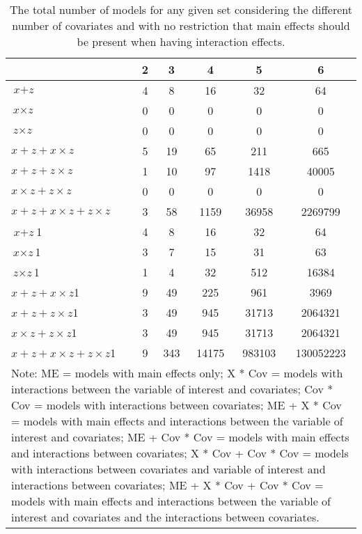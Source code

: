 \begin{table}[!h]
\centering
\caption{The total number of models for any given set considering the different number of covariates and with no restriction that main effects should be present when having interaction effects.} 
\begin{tabular}{lccccc}
  \hline
 & 2 & 3 & 4 & 5 & 6 \\ 
  \hline
$\textit{x} + \textit{z}$ & 4 & 8 & 16 & 32 & 64 \\ 
  $\textit{x} \times \textit{z}$ & 0 & 0 & 0 & 0 & 0 \\ 
  $\textit{z} \times \textit{z}$ & 0 & 0 & 0 & 0 & 0 \\ 
  $\textit{x} + \textit{z} + \textit{x} \times \textit{z}$ & 5 & 19 & 65 & 211 & 665 \\ 
  $\textit{x} + \textit{z} + \textit{z} \times \textit{z}$ & 1 & 10 & 97 & 1418 & 40005 \\ 
  $\textit{x} \times \textit{z} + \textit{z} \times \textit{z}$ & 0 & 0 & 0 & 0 & 0 \\ 
  $\textit{x} + \textit{z} + \textit{x} \times \textit{z} + \textit{z} \times \textit{z}$ & 3 & 58 & 1159 & 36958 & 2269799 \\ 
  $\textit{x} + \textit{z}$1 & 4 & 8 & 16 & 32 & 64 \\ 
  $\textit{x} \times \textit{z}$1 & 3 & 7 & 15 & 31 & 63 \\ 
  $\textit{z} \times \textit{z}$1 & 1 & 4 & 32 & 512 & 16384 \\ 
  $\textit{x} + \textit{z} + \textit{x} \times \textit{z}$1 & 9 & 49 & 225 & 961 & 3969 \\ 
  $\textit{x} + \textit{z} + \textit{z} \times \textit{z}$1 & 3 & 49 & 945 & 31713 & 2064321 \\ 
  $\textit{x} \times \textit{z} + \textit{z} \times \textit{z}$1 & 3 & 49 & 945 & 31713 & 2064321 \\ 
  $\textit{x} + \textit{z} + \textit{x} \times \textit{z} + \textit{z} \times \textit{z}$1 & 9 & 343 & 14175 & 983103 & 130052223 \\ 
   \hline 
\multicolumn{6}{p{13cm}}{\footnotesize{Note: ME = models with main effects only; X * Cov = models with interactions between the variable of interest and covariates; Cov * Cov = models with interactions between covariates;  ME + X * Cov = models with main effects and interactions between the variable of interest and covariates; ME + Cov * Cov = models with main effects and interactions between covariates; X * Cov + Cov * Cov = models with interactions between covariates and variable of interest and interactions between covariates; ME + X * Cov + Cov * Cov = models with main effects and interactions between the variable of interest and covariates and the interactions between covariates.}} 
 \hline
\end{tabular}
\end{table}
